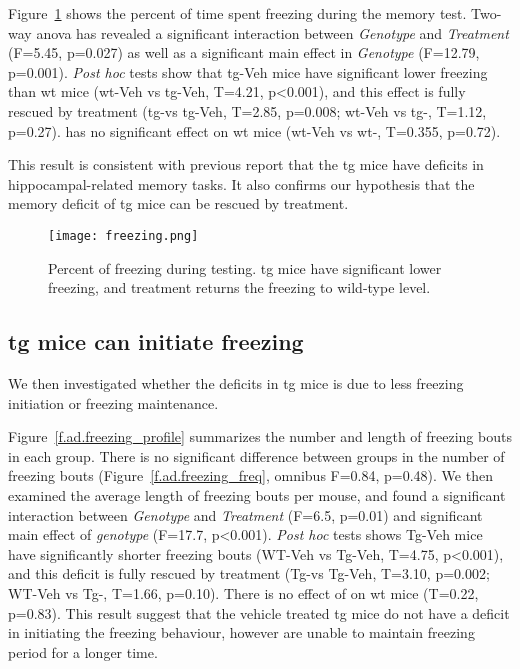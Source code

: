 Figure~\ref{f.ad.freezing} shows the percent of time spent freezing during the memory test. Two-way \gls{anova} has revealed a significant interaction between \textit{Genotype} and \textit{Treatment} (F=5.45, p=0.027) as well as a significant main effect in \textit{Genotype} (F=12.79, p=0.001).  \textit{Post hoc} tests show that \gls{tg}-Veh mice have significant lower freezing than \gls{wt} mice (\gls{wt}-Veh vs \gls{tg}-Veh, T=4.21, p<0.001), and this effect is fully rescued by \tglu treatment (\gls{tg}-\glu vs \gls{tg}-Veh, T=2.85, p=0.008; \gls{wt}-Veh vs \gls{tg}-\glu, T=1.12, p=0.27). \tglu has no significant effect on \gls{wt} mice (\gls{wt}-Veh vs \gls{wt}-\glu, T=0.355, p=0.72). 

This result is consistent with previous report  that the \gls{tg} mice have deficits in hippocampal-related memory tasks. It also confirms our hypothesis that the memory deficit of \gls{tg} mice can be rescued by \tglu treatment. 

\begin{figure}[h]
    \texttt{[image: freezing.png]}
    \caption{Percent of freezing during testing. \Gls{tg} mice have significant lower freezing, and \tglu treatment returns the freezing to wild-type level. \label{f.ad.freezing}}
\end{figure}

\subsection{\Gls{tg} mice can initiate freezing}
We then investigated whether the deficits in \gls{tg} mice is due to less freezing initiation or freezing maintenance. 

Figure~\ref{f.ad.freezing_profile} summarizes the number and length of freezing bouts in each group. There is no significant difference between groups in the number of freezing bouts (Figure~\ref{f.ad.freezing_freq}, omnibus F=0.84, p=0.48). We then examined the average length of freezing bouts per mouse, and found a significant interaction between \textit{Genotype} and \textit{Treatment} (F=6.5, p=0.01) and significant main effect of \textit{genotype} (F=17.7, p<0.001). \textit{Post hoc} tests shows Tg-Veh mice have significantly shorter freezing bouts (WT-Veh vs Tg-Veh, T=4.75, p<0.001), and this deficit is fully rescued by \tglu treatment (Tg-\glu vs Tg-Veh, T=3.10, p=0.002; WT-Veh vs Tg-\glu, T=1.66, p=0.10). There is no effect of \tglu on \gls{wt} mice (T=0.22, p=0.83). This result suggest that the vehicle treated \gls{tg} mice do not have a deficit in initiating the freezing behaviour, however are unable to maintain freezing period for a longer time. 

